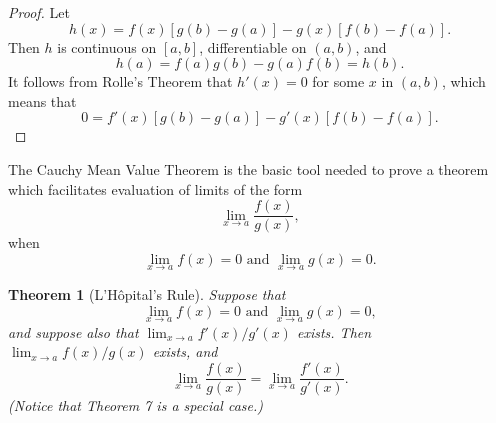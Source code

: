 \documentclass{article}
\newtheorem{theorem}{Theorem}
\begin{document}
\begin{proof}
  Let \begin{equation*}
    h(x) = f(x)[g(b) - g(a)] - g(x)[f(b) - f(a)].
  \end{equation*} Then $h$ is continuous on $[a, b]$, differentiable on $(a,
  b)$, and \begin{equation*}
    h(a) = f(a)g(b) - g(a)f(b) = h(b).
  \end{equation*} It follows from Rolle's Theorem that $h'(x) = 0$ for some $x$
  in $(a, b)$, which means that \begin{equation*}
    0 = f'(x)[g(b) - g(a)] - g'(x)[f(b) - f(a)].
  \end{equation*}
\end{proof}

The Cauchy Mean Value Theorem is the basic tool needed to prove a theorem which
facilitates evaluation of limits of the form \begin{equation*}
  \lim_{x \rightarrow a} \frac{f(x)}{g(x)},
\end{equation*} when \begin{equation*}
  \lim_{x \rightarrow a} f(x) = 0 \text{ and } \lim_{x \rightarrow a} g(x) = 0.
\end{equation*}

\begin{theorem}[L'H{\^o}pital's Rule]
  Suppose that \begin{equation*}
    \lim_{x \rightarrow a} f(x) = 0 \text{ and } \lim_{x \rightarrow a} g(x) =
    0,
  \end{equation*} and suppose also that $\lim_{x \rightarrow a} f'(x)/g'(x)$
  exists. Then $\lim_{x \rightarrow a} f(x)/g(x)$ exists, and \begin{equation*}
    \lim_{x \rightarrow a} \frac{f(x)}{g(x)} = \lim_{x \rightarrow a}
      \frac{f'(x)}{g'(x)}.
  \end{equation*} (Notice that Theorem 7 is a special case.)
\end{theorem}
\end{document}
